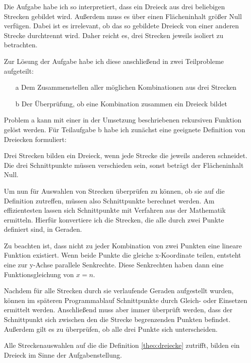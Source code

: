 Die Aufgabe habe ich so interpretiert, dass ein Dreieck aus drei beliebigen Strecken
gebildet wird.
Außerdem muss es über einen Flächeninhalt größer Null verfügen.
Dabei ist es irrelevant, ob das so gebildete Dreieck von einer
anderen Strecke durchtrennt wird.
Daher reicht es, drei Strecken jeweils isoliert zu betrachten.

Zur Lösung der Aufgabe habe ich diese anschließend in zwei Teilprobleme aufgeteilt:
\begin{itemize}
    \item[a] Dem Zusammenstellen aller möglichen Kombinationen aus drei Strecken
    \item[b] Der Überprüfung, ob eine Kombination zusammen ein Dreieck bildet
\end{itemize}

Problem a kann mit einer in der Umsetzung beschriebenen rekursiven Funktion gelöst werden.
Für Teilaufgabe b habe ich zunächst eine geeignete Definition von Dreiecken formuliert:
\begin{definition} \label{theo:dreiecke}
Drei Strecken bilden ein Dreieck,
wenn jede Strecke die jeweils anderen schneidet.
Die drei Schnittpunkte müssen verschieden sein,
sonst beträgt der Flächeninhalt Null.
\end{definition}

Um nun für Auswahlen von Strecken überprüfen zu können, ob sie auf die Definition 
zutreffen, müssen also Schnittpunkte berechnet werden.
Am effizientesten lassen sich Schnittpunkte mit Verfahren aus der Mathematik ermitteln.
Hierfür konvertiere ich die Strecken, die alle durch zwei Punkte definiert sind, in Geraden.

Zu beachten ist, dass nicht zu jeder Kombination von zwei Punkten eine lineare
Funktion existiert. Wenn beide Punkte die gleiche x-Koordinate teilen, entsteht eine zur
y-Achse parallele Senkrechte. Diese Senkrechten haben dann eine Funktionsgleichung von
\(x=n\).

Nachdem für alle Strecken durch sie verlaufende Geraden aufgestellt wurden, können
im späteren Programmablauf Schnittpunkte durch Gleich- oder Einsetzen ermittelt
werden. Anschließend muss aber immer überprüft werden, dass der Schnittpunkt sich
zwischen den die Strecke begrenzenden Punkten befindet. Außerdem gilt es zu überprüfen,
ob alle drei Punkte sich unterscheiden.

Alle Streckenauswahlen auf die die Definition \ref{theo:dreiecke} zutrifft, bilden
ein Dreieck im Sinne der Aufgabenstellung.
